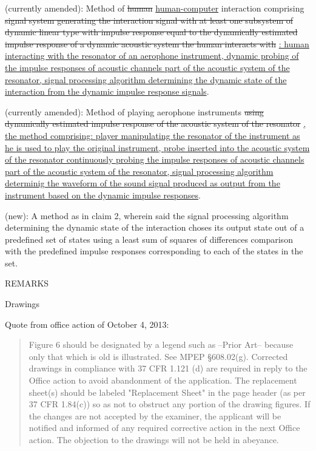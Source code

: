 \cl (currently amended): Method of \sout{human} \uline{human-computer} interaction comprising \sout{signal system generating the interaction signal with at least one subsystem of dynamic linear type with impulse response equal to the dynamically estimated impulse response of a dynamic acoustic system the human interacts with} \uline{: human interacting with the resonator of an aerophone instrument, dynamic probing of the impulse responses of acoustic channels part of the acoustic system of the resonator, signal processing algorithm determining the dynamic state of the interaction from the dynamic impulse response signals}.

\cl (currently amended): Method of playing aerophone instruments \sout{using dynamically estimated impulse response of the acoustic system of the resonator} \uline{, the method comprising: player manipulating the resonator of the instrument as he is used to play the original instrument, probe inserted into the acoustic system of the resonator continuously probing the impulse responses of acoustic channels part of the acoustic system of the resonator, signal processing algorithm determinig the waveform of the sound signal produced as output from the instrument based on the dynamic impulse responses}.

\cl (new): A method as in claim 2, wherein said the signal processing algorithm determining the dynamic state of the interaction choses its output state out of a predefined set of states using a least sum of squares of differences comparison with the predefined impulse responses corresponding to each of the states in the set.

\newpage
\begin{center}
REMARKS
\end{center}

Drawings

Quote from office action of October 4, 2013:

\begin{quote}
Figure 6 should be designated by a legend such as --Prior Art-- because only
that which is old is illustrated. See MPEP \S 608.02(g). Corrected drawings in
compliance with 37 CFR 1.121 (d) are required in reply to the Office action to avoid
abandonment of the application. The replacement sheet(s) should be labeled
"Replacement Sheet" in the page header (as per 37 CFR 1.84(c)) so as not to obstruct
any portion of the drawing figures. If the changes are not accepted by the examiner, the
applicant will be notified and informed of any required corrective action in the next Office
action. The objection to the drawings will not be held in abeyance.
\end{quote}

